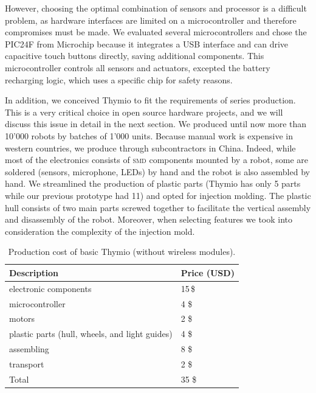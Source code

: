 \documentclass[letterpaper, 10 pt, conference]{ieeeconf}  %
\begin{document}
However, choosing the optimal combination of sensors and processor is a difficult problem, as hardware interfaces are limited on a microcontroller and therefore compromises must be made.
We evaluated several microcontrollers and chose the PIC24F from Microchip because it integrates a USB interface and can drive capacitive touch buttons directly, saving additional components. 
This microcontroller controls all sensors and actuators, excepted the battery recharging logic, which uses a specific chip for safety reasons.

In addition, we conceived Thymio to fit the requirements of series production.
This is a very critical choice in open source hardware projects, and we will discuss this issue in detail in the next section.
We produced until now more than 10'000 robots by batches of 1'000 units.
Because manual work is expensive in western countries, we produce through subcontractors in China.
Indeed, while most of the electronics consists of \textsc{smd} components mounted by a robot, some are soldered (sensors, microphone, LEDs) by hand and the robot is also assembled by hand.
We streamlined the production of plastic parts (Thymio has only 5 parts while our previous prototype had 11) and opted for injection molding. 
The plastic hull consists of two main parts screwed together to facilitate the vertical assembly and disassembly of the robot.
Moreover, when selecting features we took into consideration the complexity of the injection mold.

\begin{table}
\centering
\begin{tabularx}{\columnwidth}{ll}
\toprule
Description & Price (USD)\\
\midrule
electronic components & 15\,\$ \\
microcontroller & 4 \$ \\
motors & 2 \$ \\
plastic parts (hull, wheels, and light guides) & 4 \$ \\
assembling & 8 \$ \\
transport & 2 \$ \\
\bottomrule
Total & 35 \$ \\
\end{tabularx}
\caption{Production cost of basic Thymio (without wireless modules).}
\label{tbl:thymio-price}
\end{table}
\end{document}
